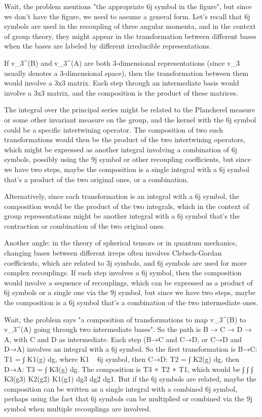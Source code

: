 Wait, the problem mentions "the appropriate 6j symbol in the figure", but since we don't have the figure, we need to assume a general form. Let's recall that 6j symbols are used in the recoupling of three angular momenta, and in the context of group theory, they might appear in the transformation between different bases when the bases are labeled by different irreducible representations. 

If v_3^(B) and v_3^(A) are both 3-dimensional representations (since v_3 usually denotes a 3-dimensional space), then the transformation between them would involve a 3x3 matrix. Each step through an intermediate basis would involve a 3x3 matrix, and the composition is the product of these matrices. 

The integral over the principal series might be related to the Plancherel measure or some other invariant measure on the group, and the kernel with the 6j symbol could be a specific intertwining operator. The composition of two such transformations would then be the product of the two intertwining operators, which might be expressed as another integral involving a combination of 6j symbols, possibly using the 9j symbol or other recoupling coefficients, but since we have two steps, maybe the composition is a single integral with a 6j symbol that's a product of the two original ones, or a combination.

Alternatively, since each transformation is an integral with a 6j symbol, the composition would be the product of the two integrals, which in the context of group representations might be another integral with a 6j symbol that's the contraction or combination of the two original ones. 

Another angle: in the theory of spherical tensors or in quantum mechanics, changing bases between different irreps often involves Clebsch-Gordan coefficients, which are related to 3j symbols, and 6j symbols are used for more complex recouplings. If each step involves a 6j symbol, then the composition would involve a sequence of recouplings, which can be expressed as a product of 6j symbols or a single one via the 9j symbol, but since we have two steps, maybe the composition is a 6j symbol that's a combination of the two intermediate ones.

Wait, the problem says "a composition of transformations to map v_3^(B) to v_3^(A) going through two intermediate bases". So the path is B → C → D → A, with C and D as intermediate. Each step (B→C and C→D, or C→D and D→A) involves an integral with a 6j symbol. So the first transformation is B→C: T1 = ∫ K1(g) dg, where K1 ~ 6j symbol, then C→D: T2 = ∫ K2(g) dg, then D→A: T3 = ∫ K3(g) dg. The composition is T3 ∘ T2 ∘ T1, which would be ∫ ∫ ∫ K3(g3) K2(g2) K1(g1) dg3 dg2 dg1. But if the 6j symbols are related, maybe the composition can be written as a single integral with a combined 6j symbol, perhaps using the fact that 6j symbols can be multiplied or combined via the 9j symbol when multiple recouplings are involved.

